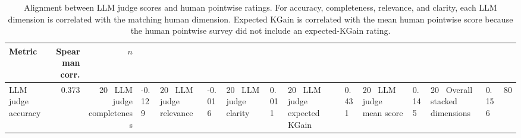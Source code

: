 \begin{table}[t]
\centering
\small
\begin{tabular}{lrr}
\toprule
Metric & Spearman corr. & $n$ \\
\midrule
LLM judge accuracy & 0.373 & 20 \
LLM judge completeness & -0.129 & 20 \
LLM judge relevance & -0.016 & 20 \
LLM judge clarity & 0.011 & 20 \
LLM judge expected KGain & 0.431 & 20 \
LLM judge mean score & 0.145 & 20 \
Overall stacked dimensions & 0.156 & 80 \
\bottomrule
\end{tabular}
\caption{Alignment between LLM judge scores and human pointwise ratings. For accuracy, completeness, relevance, and clarity, each LLM dimension is correlated with the matching human dimension. Expected KGain is correlated with the mean human pointwise score because the human pointwise survey did not include an expected-KGain rating.}
\label{tab:human_llm_judge_alignment}
\end{table}
